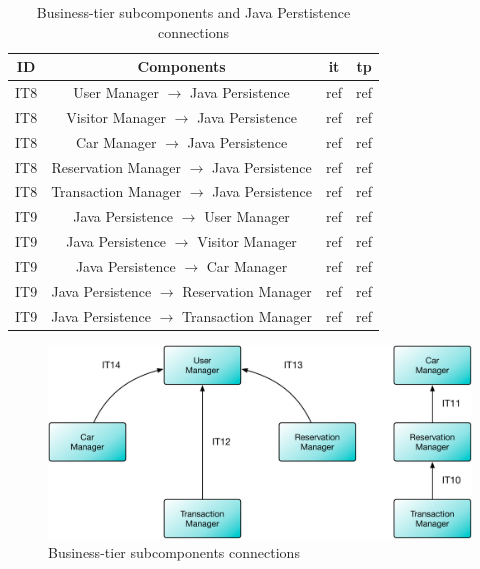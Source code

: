 \begin{table}[htbp]
\begin{center}
\begin{tabular}[t]{cccc}

\hline
\textbf{ID} & \textbf{Components} & \textbf{\acs{it}} & \textbf{\acs{tp}}\\
\hline
IT8 & \enspace User Manager $\rightarrow$ Java Persistence \enspace & ref & ref\\
\hline
IT8 & \enspace Visitor Manager $\rightarrow$ Java Persistence \enspace & ref & ref\\
\hline
IT8 & \enspace Car Manager $\rightarrow$ Java Persistence \enspace & ref & ref\\
\hline
IT8 & \enspace Reservation Manager $\rightarrow$ Java Persistence \enspace & ref & ref\\
\hline
IT8 & \enspace Transaction Manager $\rightarrow$ Java Persistence \enspace & ref & ref\\
\hline
IT9 & \enspace Java Persistence $\rightarrow$ User Manager \enspace & ref & ref\\
\hline
IT9 & \enspace Java Persistence $\rightarrow$ Visitor Manager \enspace & ref & ref\\
\hline
IT9 & \enspace Java Persistence $\rightarrow$ Car Manager \enspace & ref & ref\\
\hline
IT9 & \enspace Java Persistence $\rightarrow$ Reservation Manager \enspace & ref & ref\\
\hline
IT9 & \enspace Java Persistence $\rightarrow$ Transaction Manager \enspace & ref & ref\\
\hline

\end{tabular}
\caption{Business-tier subcomponents and Java Perstistence connections}
\end{center}
\end{table}

\clearpage

\vspace{120pt}
\begin{figure}[htbp]
\centering
\includegraphics[width=\textwidth]{Images/IT10-14.pdf}
\vspace{16pt}

\label{fig:it10-14}
\caption{Business-tier subcomponents connections}
\end{figure}
\vspace{16pt}


